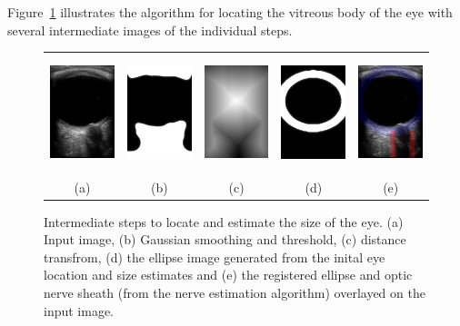 \documentclass{llncs}
\begin{document}
Figure~\ref{fig:algorithm-eye} illustrates the algorithm for locating the
vitreous body of the eye with several intermediate images of the individual
steps. 
\begin{figure}
\centering
\begin{tabular}{ccccc}
\includegraphics[height=1.32in]{019.png} &
\includegraphics[height=1.32in]{019-eye-smooth.png} &
\includegraphics[height=1.32in]{019-eye-distance.png} &         
\includegraphics[height=1.32in]{019-eye-moving.png} &
\includegraphics[height=1.32in]{019-overlay.png}\\
(a) & (b) & (c) & (d) & (e)
\end{tabular}
\caption{
\label{fig:algorithm-eye}
Intermediate steps to locate and estimate the size of the eye. (a) Input image,
(b) Gaussian smoothing and threshold, (c) distance transfrom, (d) the ellipse
image generated from the inital eye location and size estimates and (e) the
registered ellipse and optic nerve sheath (from the nerve estimation algorithm)
overlayed on the input image.
}
\end{figure}
\end{document}

